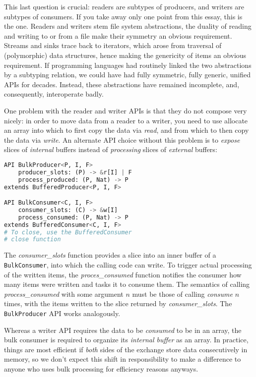 \documentclass[sigplan,screen,10pt,review]{acmart}
\begin{document}
This last question is crucial: readers are subtypes of producers, and writers are subtypes of consumers. If you take away only one point from this essay, this is the one. Readers and writers stem file system abstractions, the duality of reading and writing to or from a file make their symmetry an obvious requirement. Streams and sinks trace back to iterators, which arose from traversal of (polymorphic) data structures, hence making the genericity of items an obvious requirement. If programming languages had routinely linked the two abstractions by a subtyping relation, we could have had fully symmetric, fully generic, unified APIs for decades. Instead, these abstractions have remained incomplete, and, consequently, interoperate badly.

One problem with the reader and writer APIs is that they do not compose very nicely: in order to move data from a reader to a writer, you need to use allocate an array into which to first copy the data via \textit{read}, and from which to then copy the data via \textit{write}. An alternate API choice without this problem is to \textit{expose} slices of \textit{internal} buffers instead of \textit{processing} slices of \textit{external} buffers:

\begin{lstlisting}[language=Python]
API BulkProducer<P, I, F>
    producer_slots: (P) -> &r[I] | F
    process_produced: (P, Nat) -> P
extends BufferedProducer<P, I, F>

API BulkConsumer<C, I, F>
    consumer_slots: (C) -> &w[I]
    process_consumed: (P, Nat) -> P
extends BufferedConsumer<C, I, F>
# To close, use the BufferedConsumer
# close function
\end{lstlisting}

The \textit{consumer\_slots} function provides a slice into an inner buffer of a \texttt{BulkConsumer}, into which the calling code can write. To trigger actual processing of the written items, the \textit{proces\_consumed} function notifies the consumer how many items were written and tasks it to consume them. The semantics of calling \textit{process\_consumed} with some argument $n$ must be those of calling \textit{consume} $n$ times, with the items written to the slice returned by \textit{consumer\_slots}. The \texttt{BulkProducer} API works analogously.

Whereas a writer API requires the data to be \textit{consumed} to be in an array, the bulk consumer is required to organize its \textit{internal buffer} as an array. In practice, things are most efficient if \textit{both} sides of the exchange store data consecutively in memory, so we don't expect this shift in responsibility to make a difference to anyone who uses bulk processing for efficiency reasons anyways.
\end{document}
